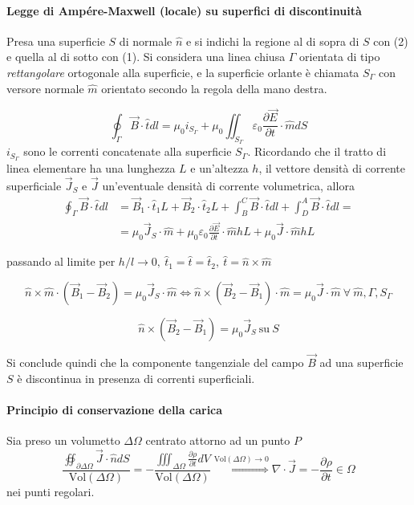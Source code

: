 
\paragraph{Legge di Ampére-Maxwell (locale) su superfici di discontinuità}
Presa una superficie $S$ di normale $\hat{n}$ e si indichi la regione al di sopra di $S$ con
(2) e quella al di sotto con (1).
Si considera una linea chiusa $\Gamma$ orientata di tipo \textit{rettangolare} ortogonale alla
superficie, e la superficie orlante è chiamata $S_\Gamma$ con versore normale $\hat{m}$ orientato 
secondo la regola della mano destra.

$$
\oint_\Gamma \vec{B}\cdot\hat{t} dl = \mu_0 i_{S_\Gamma} + \mu_0 \iint_{S_\Gamma} \varepsilon_0 \frac{\partial\vec{E}}{\partial t}\cdot\hat{m}dS 
$$
$i_{S_\Gamma}$ sono le correnti concatenate alla superficie $S_\Gamma$.
Ricordando che il tratto di linea elementare ha una lunghezza $L$ e un'altezza $h$, 
il vettore densità di corrente superficiale $\vec{J}_S$ e $\vec{J}$ un'eventuale
densità di corrente volumetrica, allora
$$\begin{aligned}
\oint_\Gamma\vec{B}\cdot\hat{t}dl &= \vec{B}_1\cdot\hat{t}_1L + \vec{B}_2\cdot\hat{t}_2L +
\int_B^C\vec{B}\cdot\hat{t}dl + \int_D^A\vec{B}\cdot\hat{t}dl = \\
&= \mu_0\vec{J}_S\cdot\hat{m} + 
\mu_0\varepsilon_0\frac{\partial\vec{E}}{\partial t}\cdot\hat{m}hL + \mu_0 \vec{J}\cdot\hat{m}hL
\end{aligned}$$

passando al limite per $h/l \to 0,\ \hat{t}_1 = \hat{t} = \hat{t}_2,\ \hat{t} = \hat{n}\times\hat{m}$

$$
\hat{n}\times\hat{m}\cdot(\vec{B}_1-\vec{B}_2) = \mu_0 \vec{J}_S \cdot \hat{m} \Leftrightarrow 
\hat{n}\times(\vec{B}_2-\vec{B}_1)\cdot\hat{m} = \mu_0 \vec{J}\cdot\hat{m}\ 
\forall\ \hat{m},\Gamma,S_\Gamma
$$

$$
\hat{n}\times(\vec{B}_2-\vec{B}_1) = \mu_0\vec{J}_S\ \text{su} \ S
$$

Si conclude quindi che la componente tangenziale del campo $\vec{B}$ ad una superficie $S$ è discontinua
in presenza di correnti superficiali.

\paragraph{Principio di conservazione della carica}
Sia preso un volumetto $\Delta\Omega$ centrato attorno ad un punto $P$
$$
\frac{\oiint_{\partial\Delta\Omega} \vec{J}\cdot\hat{n} dS}{\text{Vol}(\Delta\Omega)} = -\frac{ \iiint_{\Delta\Omega} \frac{\partial\rho}{\partial t} dV}{\text{Vol}(\Delta\Omega)} \stackrel{\text{Vol}(\Delta\Omega)\to 0} {\Rightarrow}
\nabla\cdot\vec{J} = -\frac{\partial\rho}{\partial t} \in \Omega
$$
nei punti regolari.

